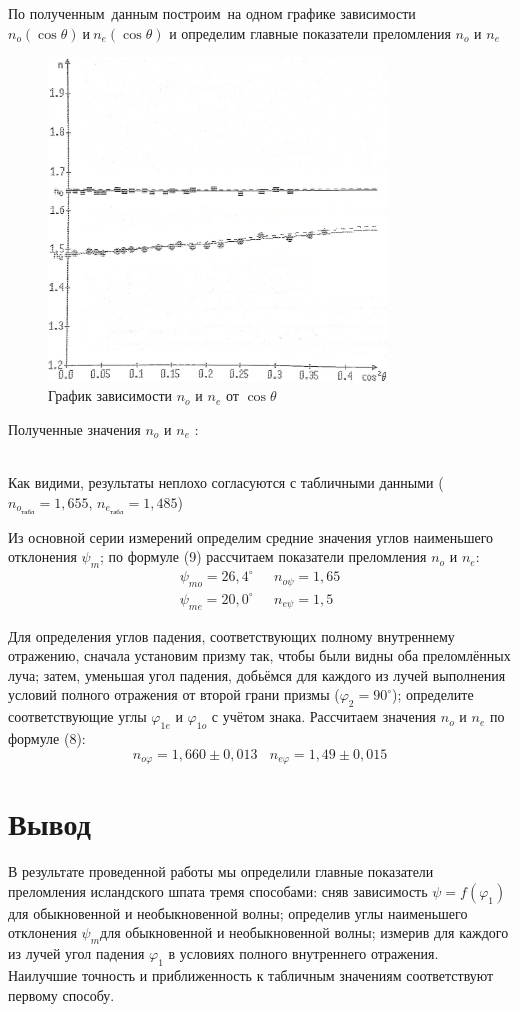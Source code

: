 \documentclass[journal, a4paper]{IEEEtran}
\begin{document}
По полученным~данным построим~на одном графике зависимости $n_o(\cos\theta) ~\text{и}~ n_e(\cos\theta)$ и определим главные показатели преломления $n_o$ и $n_e$ 


\begin{figure}[h!]
\includegraphics[width=9cm]{fig5}
\caption{График зависимости $n_o$ и $n_e$ от $\cos\theta$}
\end{figure}
Полученные значения $n_o$ и $n_e$ :


  \\[1pt]

Как видими, результаты неплохо согласуются с табличными данными ($n_{o_\text{табл}}=1,655$, $n_{e_\text{табл}}=1,485$)

Из основной серии измерений определим средние значения углов наименьшего отклонения $\psi_m$; по формуле (9) рассчитаем показатели преломления $n_o$ и $n_e$:
\[
\begin{aligned}
\psi_{mo}= 26,4^{\circ}& ~~~ n_{o\psi} = 1,65 \\
\psi_{me}= 20,0^{\circ}& ~~~ n_{e\psi} = 1,5
\end{aligned}
\]

Для определения углов падения, соответствующих полному внутреннему отражению, сначала установим призму так, чтобы были видны оба
преломлённых луча; затем, уменьшая угол падения, добьёмся для каждого из лучей выполнения условий полного отражения от второй грани
призмы ($\varphi_2=90^{\circ}$); определите соответствующие углы $\varphi_{1e}$ и $\varphi_{1o}$ с учётом
знака.
Рассчитаем значения $n_o$ и $n_e$ по формуле (8):
\[
n_{o\varphi}=1,660\pm0,013 ~~~~ n_{e\varphi}= 1,49 \pm 0,015
\]
\section{Вывод}
В результате проведенной работы мы определили главные показатели преломления исландского шпата тремя способами: сняв зависимость
$\psi = f(\varphi_1)$ для обыкновенной
и
необыкновенной волны; определив углы наименьшего отклонения
$\psi_m$для обыкновенной
и необыкновенной волны; измерив для
каждого из
лучей угол падения
$\varphi_1$ в условиях полного внутреннего отражения. Наилучшие точность и приближенность к табличным значениям соответствуют первому способу.
\end{document}
